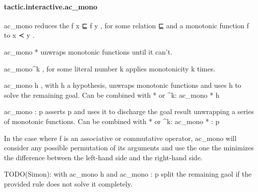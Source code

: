 \documentclass{article}
\begin{document}
\paragraph{tactic.interactive.ac\_mono}
\par
\colorbox[RGB]{253,246,227}{{{{\color[RGB]{101, 123, 131} ac\_mono }}}} reduces the 
\colorbox[RGB]{253,246,227}{{{{\color[RGB]{101, 123, 131} f x ⊑ f y }}}}, for some relation 
\colorbox[RGB]{253,246,227}{{{{\color[RGB]{101, 123, 131} ⊑ }}}} and a
monotonic function 
\colorbox[RGB]{253,246,227}{{{{\color[RGB]{101, 123, 131} f }}}} to 
\colorbox[RGB]{253,246,227}{{{{\color[RGB]{101, 123, 131} x ≺ y }}}}.
\par
\colorbox[RGB]{253,246,227}{{{{\color[RGB]{101, 123, 131} ac\_mono }}}{{{\color[RGB]{181, 137, 0} * }}}} unwraps monotonic functions until it can't.
\par
\colorbox[RGB]{253,246,227}{{{{\color[RGB]{101, 123, 131} ac\_mono\textasciicircum{}k }}}}, for some literal number 
\colorbox[RGB]{253,246,227}{{{{\color[RGB]{101, 123, 131} k }}}} applies monotonicity 
\colorbox[RGB]{253,246,227}{{{{\color[RGB]{101, 123, 131} k }}}}times.
\par
\colorbox[RGB]{253,246,227}{{{{\color[RGB]{101, 123, 131} ac\_mono h }}}}, with 
\colorbox[RGB]{253,246,227}{{{{\color[RGB]{101, 123, 131} h }}}} a hypothesis, unwraps monotonic functions
and uses 
\colorbox[RGB]{253,246,227}{{{{\color[RGB]{101, 123, 131} h }}}} to solve the remaining goal. Can be combined with * or
\textasciicircum{}k: 
\colorbox[RGB]{253,246,227}{{{{\color[RGB]{101, 123, 131} ac\_mono }}}{{{\color[RGB]{181, 137, 0} * }}}{{{\color[RGB]{101, 123, 131}  h }}}}\par
\colorbox[RGB]{253,246,227}{{{{\color[RGB]{101, 123, 131} ac\_mono : p }}}} asserts 
\colorbox[RGB]{253,246,227}{{{{\color[RGB]{101, 123, 131} p }}}} and uses it to discharge the goal result
unwrapping a series of monotonic functions. Can be combined with * or
\textasciicircum{}k: 
\colorbox[RGB]{253,246,227}{{{{\color[RGB]{101, 123, 131} ac\_mono }}}{{{\color[RGB]{181, 137, 0} * }}}{{{\color[RGB]{101, 123, 131}  : p }}}}\par
In the case where 
\colorbox[RGB]{253,246,227}{{{{\color[RGB]{101, 123, 131} f }}}} is an associative or commutative operator,
\colorbox[RGB]{253,246,227}{{{{\color[RGB]{101, 123, 131} ac\_mono }}}} will consider any possible permutation of its arguments
and use the one the minimizes the difference between the left-hand
side and the right-hand side.
\par
TODO(Simon): with 
\colorbox[RGB]{253,246,227}{{{{\color[RGB]{101, 123, 131} ac\_mono h }}}} and 
\colorbox[RGB]{253,246,227}{{{{\color[RGB]{101, 123, 131} ac\_mono : p }}}} split the remaining
gaol if the provided rule does not solve it completely.
\end{document}

